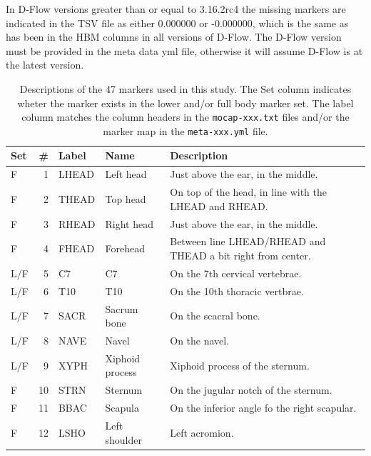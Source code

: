 \documentclass[10pt,a4paper,twocolumn]{article}
\begin{document}
In D-Flow versions greater than or equal to 3.16.2rc4 the missing markers are
indicated in the TSV file as either 0.000000 or -0.000000, which is the same as
has been in the HBM columns in all versions of D-Flow. The D-Flow version must
be provided in the meta data yml file, otherwise it will assume D-Flow is at
the latest version.

\begin{table}
  \cprotect\caption{Descriptions of the 47 markers used in this study. The Set
    column indicates wheter the marker exists in the lower and/or full body
    marker set.  The label column matches the column headers in the
    \verb|mocap-xxx.txt| files and/or the marker map in the \verb|meta-xxx.yml|
    file.}
  \centering
  \small
  \begin{tabular}{lrlll}
    \toprule
    Set & \# & Label & Name & Description \\
    \midrule
    F   & 1  & LHEAD & Left head                             & Just above the ear, in the middle. \\
    F   & 2  & THEAD & Top head                              & On top of the head, in line with the LHEAD and RHEAD. \\
    F   & 3  & RHEAD & Right head                            & Just above the ear, in the middle. \\
    F   & 4  & FHEAD & Forehead                              & Between line LHEAD/RHEAD and THEAD a bit right from center. \\
    L/F & 5  & C7    & C7                                    & On the 7th cervical vertebrae. \\
    L/F & 6  & T10   & T10                                   & On the 10th thoracic vertbrae. \\
    L/F & 7  & SACR  & Sacrum bone                           & On the scacral bone. \\
    L/F & 8  & NAVE  & Navel                                 & On the navel. \\
    L/F & 9  & XYPH  & Xiphoid process                       & Xiphoid process of the sternum. \\
    F   & 10 & STRN  & Sternum                               & On the jugular notch of the sternum. \\
    F   & 11 & BBAC  & Scapula                               & On the inferior angle fo the right scapular. \\
    F   & 12 & LSHO  & Left shoulder                         & Left acromion. \\

\end{tabular}
\end{table}
\end{document}
